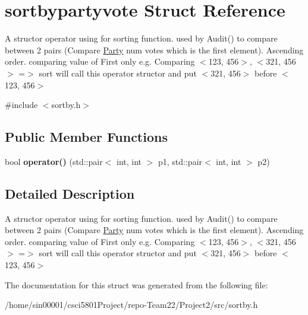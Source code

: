 \hypertarget{structsortbypartyvote}{}\section{sortbypartyvote Struct Reference}
\label{structsortbypartyvote}


A structor operator using for sorting function. used by Audit() to compare between 2 pairs (Compare \hyperlink{classParty}{Party} num votes which is the first element). Ascending order. comparing value of First only e.\+g. Comparing $<$123, 456$>$, $<$321, 456$>$ =$>$ sort will call this operator structor and put $<$321, 456$>$ before $<$123, 456$>$  




{\ttfamily \#include $<$sortby.\+h$>$}

\subsection*{Public Member Functions}
\begin{DoxyCompactItemize}
\item 
\mbox{\label{structsortbypartyvote_a3b61e39588313445e723942a6f0e5498}} 
bool {\bfseries operator()} (std\+::pair$<$ int, int $>$ p1, std\+::pair$<$ int, int $>$ p2)
\end{DoxyCompactItemize}


\subsection{Detailed Description}
A structor operator using for sorting function. used by Audit() to compare between 2 pairs (Compare \hyperlink{classParty}{Party} num votes which is the first element). Ascending order. comparing value of First only e.\+g. Comparing $<$123, 456$>$, $<$321, 456$>$ =$>$ sort will call this operator structor and put $<$321, 456$>$ before $<$123, 456$>$ 

The documentation for this struct was generated from the following file\+:\begin{DoxyCompactItemize}
\item 
/home/sin00001/csci5801\+Project/repo-\/\+Team22/\+Project2/src/sortby.\+h\end{DoxyCompactItemize}
